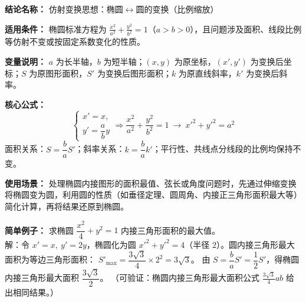 \textbf{结论名称：} 仿射变换思想：椭圆$\leftrightarrow$圆的变换（比例缩放）

\textbf{适用条件：} 椭圆标准方程为 $\frac{x^2}{a^2}+\frac{y^2}{b^2}=1$（$a>b>0$），且问题涉及面积、线段比例等仿射不变或按固定系数变化的性质。

\textbf{变量说明：} $a$ 为长半轴，$b$ 为短半轴；$(x,y)$ 为原坐标，$(x',y')$ 为变换后坐标；$S$ 为原图形面积，$S'$ 为变换后图形面积；$k$ 为原直线斜率，$k'$ 为变换后斜率。

\textbf{核心公式：}
\[
\boxed{\begin{cases}
x' = x,\\[2pt]
y' = \dfrac{a}{b}y
\end{cases}\Longrightarrow \frac{x^2}{a^2}+\frac{y^2}{b^2}=1\ \longrightarrow\ x'^2+y'^2=a^2}
\]
面积关系：$S = \dfrac{b}{a}S'$；斜率关系：$k = \dfrac{b}{a}k'$；平行性、共线点分线段的比例均保持不变。

\textbf{使用场景：} 处理椭圆内接图形的面积最值、弦长或角度问题时，先通过伸缩变换将椭圆变为圆，利用圆的性质（如垂径定理、圆周角、内接正三角形面积最大等）简化计算，再将结果还原到椭圆。

\textbf{简单例子：} 求椭圆 $\dfrac{x^2}{4}+y^2=1$ 内接三角形面积的最大值。\\
解：令 $x'=x,\ y'=2y$，椭圆化为圆 $x'^2+y'^2=4$（半径 $2$）。圆内接三角形最大面积为等边三角形面积：
$S'_{\max}= \dfrac{3\sqrt{3}}{4}\times 2^2 = 3\sqrt{3}$。
由 $S = \dfrac{b}{a}S' = \dfrac{1}{2}S'$，得椭圆内接三角形最大面积 $\dfrac{3\sqrt{3}}{2}$。
（可验证：椭圆内接三角形最大面积公式 $\frac{3\sqrt{3}}{4}ab$ 给出相同结果。）